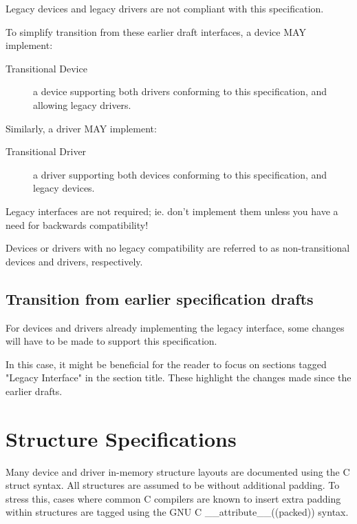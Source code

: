 Legacy devices and legacy drivers are not compliant with this
specification.

To simplify transition from these earlier draft interfaces,
a device MAY implement:

\begin{description}
\item[Transitional Device]
        a device supporting both drivers conforming to this
        specification, and allowing legacy drivers.
\end{description}

Similarly, a driver MAY implement:
\begin{description}
\item[Transitional Driver]
        a driver supporting both devices conforming to this
        specification, and legacy devices.
\end{description}

\begin{note}
  Legacy interfaces are not required; ie. don't implement them unless you
  have a need for backwards compatibility!
\end{note}

Devices or drivers with no legacy compatibility are referred to as
non-transitional devices and drivers, respectively.

\subsection{Transition from earlier specification drafts}\label{sec:Transition from earlier specification drafts}

For devices and drivers already implementing the legacy
interface, some changes will have to be made to support this
specification.

In this case, it might be beneficial for the reader to focus on
sections tagged "Legacy Interface" in the section title.
These highlight the changes made since the earlier drafts.

\section{Structure Specifications}

Many device and driver in-memory structure layouts are documented using
the C struct syntax. All structures are assumed to be without additional
padding. To stress this, cases where common C compilers are known to insert
extra padding within structures are tagged using the GNU C
__attribute__((packed))  syntax.

